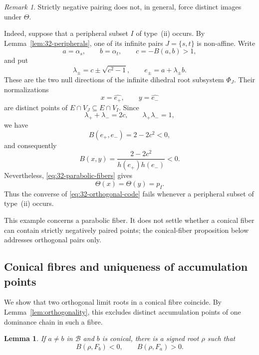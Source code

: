 \documentclass[11pt,reqno]{amsart}
\theoremstyle{plain}
\newtheorem{lemma}[theorem]{Lemma}
\theoremstyle{definition}
\theoremstyle{remark}
\newtheorem{remark}[theorem]{Remark}
\numberwithin{equation}{section}
\begin{document}
\begin{remark}\label{rem:32-negative-same-image}
Strictly negative pairing does not, in general, force distinct
images under $\Theta$.

Indeed, suppose that a peripheral subset $I$ of
type~\textup{(ii)} occurs. By Lemma~\ref{lem:32-peripherals},
one of its infinite pairs $J=\{s,t\}$ is non-affine.
Write
\[
    a=\alpha_s,\qquad b=\alpha_t,\qquad c=-B(a,b)>1,
\]
and put
\[
    \lambda_\pm=c\pm\sqrt{c^2-1},
    \qquad
    e_\pm=a+\lambda_\pm b.
\]
These are the two null directions of the infinite dihedral
root subsystem $\Phi_J$. Their normalizations
\[
    x=\widehat{e_+},
    \qquad
    y=\widehat{e_-}
\]
are distinct points of $E\cap V_J\subseteq E\cap V_I$.
Since
\[
    \lambda_++\lambda_-=2c,
    \qquad
    \lambda_+\lambda_-=1,
\]
we have
\[
    B(e_+,e_-)=2-2c^2<0,
\]
and consequently
\[
    B(x,y)=\frac{2-2c^2}{h(e_+)h(e_-)}<0.
\]
Nevertheless, \eqref{eq:32-parabolic-fibers} gives
\[
    \Theta(x)=\Theta(y)=p_I.
\]
Thus the converse of \eqref{eq:32-orthogonal-code} fails
whenever a peripheral subset of type~\textup{(ii)} occurs.

This example concerns a parabolic fiber. It does not settle
whether a conical fiber can contain strictly negatively paired
points; the conical-fiber proposition below addresses
orthogonal pairs only.
\end{remark}
\subsection{Conical fibres and uniqueness of accumulation points}\label{subsec:32-conical}

We show that two orthogonal limit roots in a conical fibre coincide.
By Lemma~\ref{lem:orthogonality}, this excludes distinct accumulation
points of one dominance chain in such a fibre.

\begin{lemma}\label{lem:32-separation}
If $a\ne b$ in $\mathcal B$ and $b$ is conical,
there is a signed root $\rho$ such that
\[
    B(\rho,F_b)<0,\qquad B(\rho,F_a)>0.
\]
\end{lemma}
\end{document}
